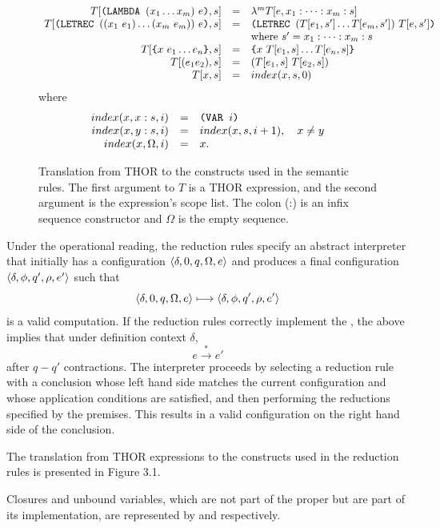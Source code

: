 \begin{figure}
\[
\begin{array}{rcl}
T[\THOR{(LAMBDA }(x_1\ldots x_m)\ e\THOR{)},s]
  &=& \lambda^m T[e,x_1:\cdots:x_m:s]\\
T[\THOR{(LETREC }((x_1\ e_1)\ldots(x_m\ e_m))\ e\THOR{)},s]
  &=& \THOR{(LETREC }(T[e_1,s']\ldots T[e_m,s'])\ T[e,s']\THOR{)}\\
&& \text{where } s'=x_1:\cdots:x_m:s\\
T[\THOR{\{}x\ e_1\ldots e_n\THOR{\}},s]
  &=& \THOR{\{}x\ T[e_1,s]\ldots T[e_n,s]\THOR{\}}\\
T[(e_1e_2),s] &=& (T[e_1,s]\ T[e_2,s])\\
T[x,s] &=& index(x,s,0)
\end{array}
\]
where
\[
\begin{array}{rcl}
index(x,x:s,i)&=&\texttt{(VAR }i\texttt{)}\\
index(x,y:s,i)&=&index(x,s,i+1),\quad x\ne y\\
index(x,\Omega,i)&=&x.
\end{array}
\]
\caption[THOR Translation Rules]{Translation from THOR to the constructs used in the semantic rules.
The first argument to \(T\) is a THOR expression, and the second argument is the
expression's scope list. The colon (:) is an infix sequence constructor and
\(\Omega\) is the empty sequence.}
\end{figure}

Under the operational reading, the reduction rules specify an abstract
interpreter that initially has a configuration \(\langle \delta,0,q,\Omega,e\rangle\)
and produces a final configuration \(\langle \delta,\phi,q',\rho,e'\rangle\) such
that
\[
\langle \delta,0,q,\Omega,e\rangle\longmapsto
\langle \delta,\phi,q',\rho,e'\rangle
\]
is a valid computation. If the reduction rules correctly implement the
\lambdacalculus, the above implies that under definition context \(\delta\),
\[
e\overset{*}{\longrightarrow} e'
\]
after \(q-q'\) contractions. The interpreter proceeds by selecting a reduction
rule with a conclusion whose left hand side matches the current configuration
and whose application conditions are satisfied, and then performing the
reductions specified by the premises. This results in a valid configuration on
the right hand side of the conclusion.

The translation from THOR expressions to the constructs used in the reduction
rules is presented in Figure 3.1.

Closures and unbound variables, which are not part of the \lambdacalculus{}
proper but are part of its implementation, are represented by  and  respectively.

